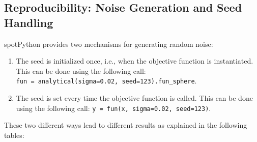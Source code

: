 \documentclass[
  letterpaper,
  DIV=11,
  numbers=noendperiod]{scrreprt}
\providecommand{\tightlist}{%
  \setlength{\itemsep}{0pt}\setlength{\parskip}{0pt}}\usepackage{longtable,booktabs,array}
\begin{document}
\hypertarget{reproducibility-noise-generation-and-seed-handling}{%
\subsection{Reproducibility: Noise Generation and Seed
Handling}\label{reproducibility-noise-generation-and-seed-handling}}

spotPython provides two mechanisms for generating random noise:

\begin{enumerate}
\def\labelenumi{\arabic{enumi}.}
\tightlist
\item
  The seed is initialized once, i.e., when the objective function is
  instantiated. This can be done using the following call:
  \texttt{fun\ =\ analytical(sigma=0.02,\ seed=123).fun\_sphere}.
\item
  The seed is set every time the objective function is called. This can
  be done using the following call:
  \texttt{y\ =\ fun(x,\ sigma=0.02,\ seed=123)}.
\end{enumerate}

These two different ways lead to different results as explained in the
following tables:
\end{document}
